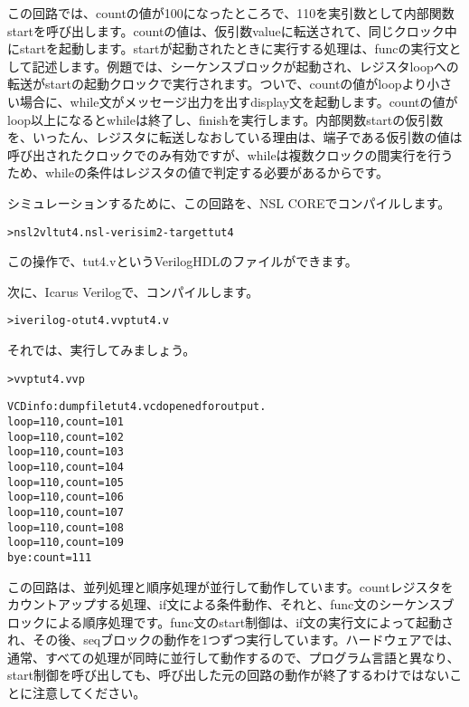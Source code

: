 この回路では、countの値が100になったところで、110を実引数として内部関数startを呼び出します。countの値は、仮引数valueに転送されて、同じクロック中にstartを起動します。startが起動されたときに実行する処理は、funcの実行文として記述します。例題では、シーケンスブロックが起動され、レジスタloopへの転送がstartの起動クロックで実行されます。ついで、countの値がloopより小さい場合に、while文がメッセージ出力を出す\textunderscore{}display文を起動します。countの値がloop以上になるとwhileは終了し、\textunderscore{}finishを実行します。内部関数startの仮引数を、いったん、レジスタに転送しなおしている理由は、端子である仮引数の値は呼び出されたクロックでのみ有効ですが、whileは複数クロックの間実行を行うため、whileの条件はレジスタの値で判定する必要があるからです。

シミュレーションするために、この回路を、NSL COREでコンパイルします。

\begin{reviewcmd}
\begin{alltt}
\textgreater{} nsl2vl tut4.nsl -verisim2 -target tut4
\end{alltt}
\end{reviewcmd}

この操作で、tut4.vというVerilogHDLのファイルができます。

次に、Icarus Verilogで、コンパイルします。

\begin{reviewcmd}
\begin{alltt}
\textgreater{} iverilog -o tut4.vvp tut4.v
\end{alltt}
\end{reviewcmd}

それでは、実行してみましょう。

\begin{reviewcmd}
\begin{alltt}
\textgreater{} vvp tut4.vvp

VCD info: dumpfile tut4.vcd opened for output.
loop = 110, count = 101
loop = 110, count = 102
loop = 110, count = 103
loop = 110, count = 104
loop = 110, count = 105
loop = 110, count = 106
loop = 110, count = 107
loop = 110, count = 108
loop = 110, count = 109
bye: count = 111
\end{alltt}
\end{reviewcmd}

この回路は、並列処理と順序処理が並行して動作しています。countレジスタをカウントアップする処理、if文による条件動作、それと、func文のシーケンスブロックによる順序処理です。func文のstart制御は、if文の実行文によって起動され、その後、seqブロックの動作を1つずつ実行しています。ハードウェアでは、通常、すべての処理が同時に並行して動作するので、プログラム言語と異なり、start制御を呼び出しても、呼び出した元の回路の動作が終了するわけではないことに注意してください。

